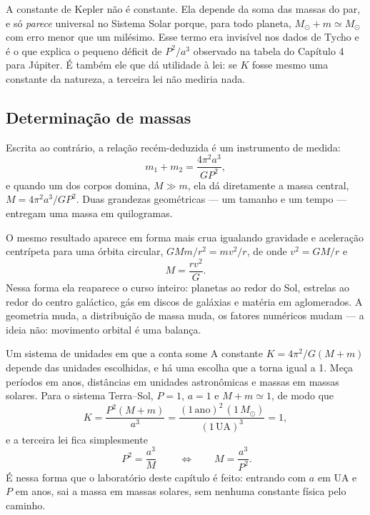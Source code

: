 \documentclass[11pt,a4paper]{article}
\begin{document}
A constante de Kepler não é constante. Ela depende da soma das massas do par, e só \emph{parece} universal no
Sistema Solar porque, para todo planeta, $M_\odot+m\simeq M_\odot$ com erro menor que um milésimo. Esse termo
era invisível nos dados de Tycho e é o que explica o pequeno déficit de $P^{2}/a^{3}$ observado na tabela do
Capítulo 4 para Júpiter. É também ele que dá utilidade à lei: se $K$ fosse mesmo uma constante da natureza, a
terceira lei não mediria nada.

\subsection*{Determinação de massas}

Escrita ao contrário, a relação recém-deduzida é um instrumento de medida:
\[
m_1+m_2=\frac{4\pi^{2}a^{3}}{GP^{2}},
\]
e quando um dos corpos domina, $M\gg m$, ela dá diretamente a massa central, $M=4\pi^{2}a^{3}/GP^{2}$. Duas
grandezas geométricas --- um tamanho e um tempo --- entregam uma massa em quilogramas.

O mesmo resultado aparece em forma mais crua igualando gravidade e aceleração centrípeta para uma órbita
circular, $GMm/r^{2}=mv^{2}/r$, de onde $v^{2}=GM/r$ e
\[
M=\frac{rv^{2}}{G}.
\]
Nessa forma ela reaparece o curso inteiro: planetas ao redor do Sol, estrelas ao redor do centro galáctico, gás
em discos de galáxias e matéria em aglomerados. A geometria muda, a distribuição de massa muda, os fatores
numéricos mudam --- a ideia não: movimento orbital é uma balança.

\begin{lessonblock}{Um sistema de unidades em que a conta some}
A constante $K=4\pi^{2}/G(M+m)$ depende das unidades escolhidas, e há uma escolha que a torna igual a 1.
Meça períodos em anos, distâncias em unidades astronômicas e massas em massas solares. Para o sistema
Terra--Sol, $P=1$, $a=1$ e $M+m\simeq1$, de modo que
\[
K=\frac{P^{2}(M+m)}{a^{3}}=\frac{(1\,\text{ano})^{2}\,(1\,M_\odot)}{(1\,\mathrm{UA})^{3}}=1,
\]
e a terceira lei fica simplesmente
\[
\boxed{\ P^{2}=\frac{a^{3}}{M}\ }
\qquad\Longleftrightarrow\qquad
M=\frac{a^{3}}{P^{2}}.
\]
É nessa forma que o laboratório deste capítulo é feito: entrando com $a$ em UA e $P$ em anos, sai a massa em
massas solares, sem nenhuma constante física pelo caminho.
\end{lessonblock}
\end{document}
